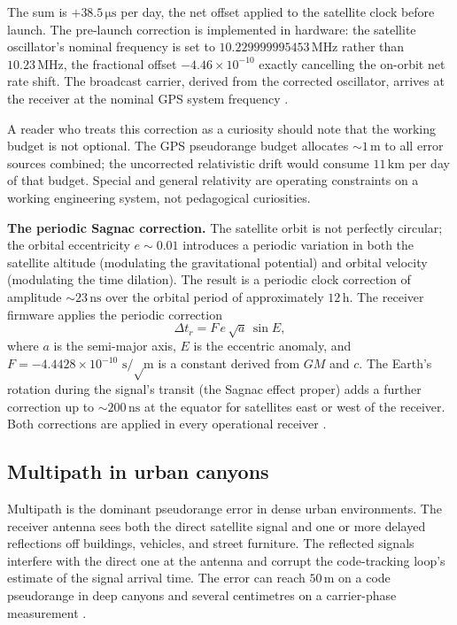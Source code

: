 The sum is $+38.5 \,\si{\micro\second}$ per day, the net offset
applied to the satellite clock before launch. The pre-launch
correction is implemented in hardware: the satellite oscillator's
nominal frequency is set to $10.229999995453 \,\si{\mega\hertz}$
rather than $10.23 \,\si{\mega\hertz}$, the fractional offset
$-4.46 \times 10^{-10}$ exactly cancelling the on-orbit net rate
shift. The broadcast carrier, derived from the corrected
oscillator, arrives at the receiver at the nominal GPS system
frequency \cite{paper:ch06t3-ashby-2003}.

A reader who treats this correction as a curiosity should note
that the working budget is not optional. The GPS pseudorange
budget allocates $\sim 1 \,\si{\meter}$ to all error sources
combined; the uncorrected relativistic drift would consume $11
\,\si{\kilo\meter}$ per day of that budget. Special and general
relativity are operating constraints on a working engineering
system, not pedagogical curiosities.

\textbf{The periodic Sagnac correction.} The satellite orbit is
not perfectly circular; the orbital eccentricity $e \sim 0.01$
introduces a periodic variation in both the satellite altitude
(modulating the gravitational potential) and orbital velocity
(modulating the time dilation). The result is a periodic clock
correction of amplitude $\sim 23 \,\si{\nano\second}$ over the
orbital period of approximately $12 \,\si{\hour}$. The receiver
firmware applies the periodic correction
\[
\Delta t_{r} = F \,e\, \sqrt{a}\, \sin E,
\]
where $a$ is the semi-major axis, $E$ is the eccentric anomaly,
and $F = -4.4428 \times 10^{-10} \,\si{\second\per\sqrt\meter}$ is
a constant derived from $GM$ and $c$. The Earth's rotation during
the signal's transit (the Sagnac effect proper) adds a further
correction up to $\sim 200 \,\si{\nano\second}$ at the equator for
satellites east or west of the receiver. Both corrections are
applied in every operational receiver
\cite{paper:ch06t3-ashby-2003}.

\subsection{Multipath in urban canyons}

Multipath is the dominant pseudorange error in dense urban
environments. The receiver antenna sees both the direct
satellite signal and one or more delayed reflections off
buildings, vehicles, and street furniture. The reflected signals
interfere with the direct one at the antenna and corrupt the
code-tracking loop's estimate of the signal arrival time. The
error can reach $50 \,\si{\meter}$ on a code pseudorange in deep
canyons and several centimetres on a carrier-phase measurement
\cite{text:ch06t3-kaplan-hegarty-2017}.

